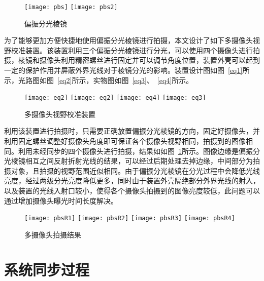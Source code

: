 \begin{figure}[h]
  \centering%
    {\texttt{[image: pbs]}}
      {\texttt{[image: pbs2]}}
  \caption{偏振分光棱镜}
\end{figure}

为了能够更加方便快捷地使用偏振分光棱镜进行拍摄，本文设计了如下多摄像头视野校准装置。该装置利用三个偏振分光棱镜进行分光，可以使用四个摄像头进行拍摄，棱镜和摄像头利用精密螺丝进行固定并可以调节角度位置，装置外壳可以起到一定的保护作用并屏蔽外界光线对于棱镜分光的影响。装置设计图如图~\ref{eq1}所示，光路图如图~\ref{eq2}所示，实物图如图~\ref{eq3}、~\ref{eq4}所示。

\begin{figure}[h]
  \centering%
    {\texttt{[image: eq2]}}
      {\texttt{[image: eq2]}}
      {\texttt{[image: eq4]}}
      {\texttt{[image: eq3]}}
  \caption{多摄像头视野校准装置}
\end{figure}

利用该装置进行拍摄时，只需要正确放置偏振分光棱镜的方向，固定好摄像头，并利用固定螺丝调整好摄像头角度即可保证各个摄像头视野相同，拍摄到的图像相同。利用未经同步的四个摄像头进行拍摄，结果如如图~\ref{pbsR}所示。图像边缘是偏振分光棱镜相互之间反射折射光线的结果，可以经过后期处理去掉边缘，中间部分为拍摄对象，且拍摄的视野范围近似相同。由于偏振分光棱镜在分光过程中会降低光线亮度，经过两级分光亮度降低更多，同时由于装置外壳隔绝部分外界光线的射入，以及装置的光线入射口较小，使得各个摄像头拍摄到的图像亮度较低，此问题可以通过增加摄像头曝光时间长度解决。

\begin{figure}[h]
  \centering%
    {\texttt{[image: pbsR1]}}
      {\texttt{[image: pbsR2]}}
      {\texttt{[image: pbsR3]}}
      {\texttt{[image: pbsR4]}}
  \caption{多摄像头拍摄结果}
  \label{pbsR}
\end{figure}

\section{系统同步过程}

